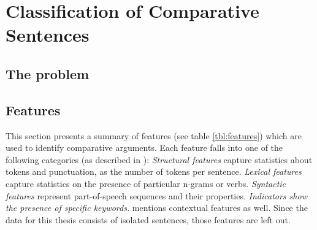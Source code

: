 \chapter{Classification of Comparative Sentences}
\section{The problem}
\label{sec:problem}
\section{Features}
\label{sec:features}
This section presents a summary of features (see table \ref{tbl:features}) which are used to identify comparative arguments.  Each feature falls into one of the following categories (as described in \cite{Aker2017What-works-and-}): \emph{Structural features} capture statistics about tokens and punctuation, as the number of tokens per sentence. \emph{Lexical features} capture statistics on the presence of particular n-grams or verbs. \emph{Syntactic features} represent part-of-speech sequences and their properties. \emph{Indicators show the presence of specific keywords.}
\cite{Aker2017What-works-and-} mentions contextual features as well. Since the data for this thesis consists of isolated sentences, those features are left out.

